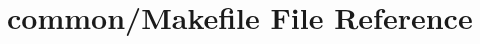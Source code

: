 \hypertarget{common_2Makefile}{\section{common/\-Makefile File Reference}
\label{common_2Makefile}
}
